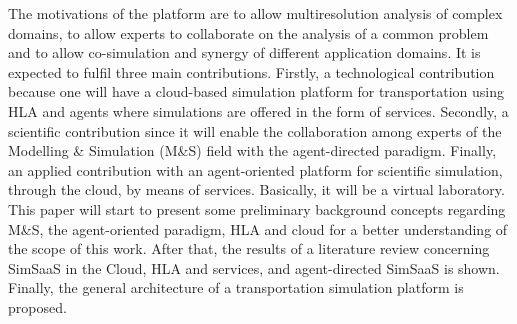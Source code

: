 \documentclass[a0paper,fontscale=0.4125,landscape]{baposter} %
\begin{document}
\begin{poster}
{The motivations of the platform are to allow multiresolution analysis of complex domains, to allow experts to collaborate on the analysis of a common problem and to allow co-simulation and synergy of different application domains. It is expected to fulfil three main contributions. Firstly, a technological contribution because one will have a cloud-based simulation platform for transportation using HLA and agents where simulations are offered in the form of services. Secondly, a scientific contribution since it will enable the collaboration among experts of the Modelling \& Simulation (M\&S) field with the agent-directed paradigm. Finally, an applied contribution with an agent-oriented platform for scientific simulation, through the cloud, by means of services. Basically, it will be a virtual laboratory.
This paper will start to present some preliminary background concepts regarding M\&S, the agent-oriented paradigm, HLA and cloud for a better understanding of the scope of this work. After that, the results of a literature review concerning SimSaaS in the Cloud, HLA and services, and agent-directed SimSaaS is shown. Finally, the general architecture of a transportation simulation platform is proposed.


}

 {
}

 {
}


\end{poster}
\end{document}
